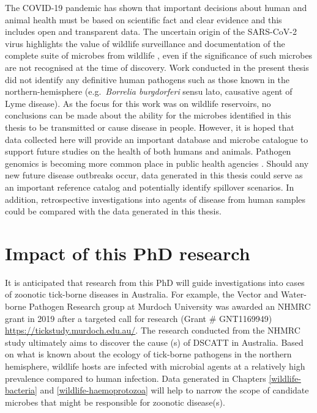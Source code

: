 \documentclass[a4paper, nobind]{templates/ociamthesis}
\begin{document}
The COVID-19 pandemic has shown that important decisions about human and animal health must be based on scientific fact and clear evidence and this includes open and transparent data.
The uncertain origin of the SARS-CoV-2 virus highlights the value of wildlife surveillance and documentation of the complete suite of microbes from wildlife \autocite{burkiOriginSARSCoV22020}, even if the significance of such microbes are not recognised at the time of discovery.
Work conducted in the present thesis did not identify any definitive human pathogens such as those known in the northern-hemisphere (e.g.~\emph{Borrelia burgdorferi} sensu lato, causative agent of Lyme disease).
As the focus for this work was on wildlife reservoirs, no conclusions can be made about the ability for the microbes identified in this thesis to be transmitted or cause disease in people.
However, it is hoped that data collected here will provide an important database and microbe catalogue to support future studies on the health of both humans and animals.
Pathogen genomics is becoming more common place in public health agencies \autocite{armstrongPathogenGenomicsPublic2019}.
Should any new future disease outbreaks occur, data generated in this thesis could serve as an important reference catalog and potentially identify spillover scenarios.
In addition, retrospective investigations into agents of disease from human samples could be compared with the data generated in this thesis.

\hypertarget{impact-of-this-phd-research}{%
\section{Impact of this PhD research}\label{impact-of-this-phd-research}}

It is anticipated that research from this PhD will guide investigations into cases of zoonotic tick-borne diseases in Australia.
For example, the Vector and Water-borne Pathogen Research group at Murdoch University was awarded an NHMRC grant in 2019 after a targeted call for research (Grant \# GNT1169949) \url{https://tickstudy.murdoch.edu.au/}.
The research conducted from the NHMRC study ultimately aims to discover the cause (s) of DSCATT in Australia.
Based on what is known about the ecology of tick-borne pathogens in the northern hemisphere, wildlife hosts are infected with microbial agents at a relatively high prevalence compared to human infection.
Data generated in Chapters \ref{wildlife-bacteria} and \ref{wildlife-haemoprotozoa} will help to narrow the scope of candidate microbes that might be responsible for zoonotic disease(s).
\end{document}
